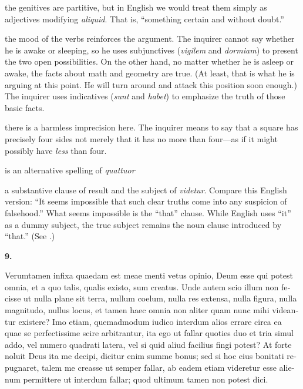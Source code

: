  the genitives are partitive, but in English we would treat them simply as adjectives modifying \textit{aliquid}. That is, ``something certain and without doubt.''

 the mood of the verbs reinforces the argument. The inquirer cannot say whether he is awake or sleeping, so he uses subjunctives (\textit{vigilem} and \textit{dormiam}) to present the two open possibilities. On the other hand, no matter whether he is asleep or awake, the facts about math and geometry are true. (At least, that is what he is arguing at this point. He will turn around and attack this position soon enough.) The inquirer uses indicatives (\textit{sunt} and \textit{habet}) to emphasize the truth of those basic facts.

 there is a harmless imprecision here. The inquirer means to say that a square has precisely four sides not merely that it has no more than four---as if it might possibly have \textit{less} than four.

 is an alternative spelling of \textit{quattuor}

 a substantive clause of result and the subject of \textit{videtur}. Compare this English version: ``It seems impossible that such clear truths come into any suspicion of falsehood.'' What seems impossible is the ``that'' clause. While English uses ``it'' as a dummy subject, the true subject remains the noun clause introduced by ``that.'' (See \cite[218]{huddleston2005}.)

\clearpage

\beginnumbering
\pstart
\textbf{9.} \begin{latin}Verumtamen infixa quaedam est meae menti vetus opinio, Deum esse qui potest omnia, et a quo talis, qualis existo, sum creatus. Unde autem scio illum non fecisse ut nulla plane sit terra, nullum coelum, nulla res extensa, nulla figura, nulla magnitudo, nullus locus, et tamen haec omnia non aliter quam nunc mihi videantur existere? Imo etiam, quemadmodum iudico interdum alios errare circa ea quae se perfectissime scire arbitrantur, ita ego ut fallar quoties duo et tria simul addo, vel numero quadrati latera, vel si quid aliud facilius fingi potest? At forte noluit Deus ita me decipi, dicitur enim summe bonus; sed si hoc eius bonitati repugnaret, talem me creasse ut semper fallar, ab eadem etiam videretur esse alienum permittere ut interdum fallar; quod ultimum tamen non potest dici.\end{latin}
\pend
\endnumbering

